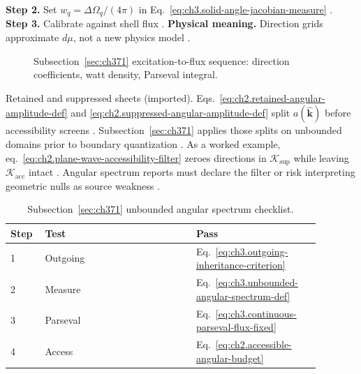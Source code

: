 \textbf{Step 2.} Set \(w_{q}=\Delta\Omega_{q}/(4\pi)\) in Eq.~\eqref{eq:ch3.solid-angle-jacobian-measure} \cite{hansen1988}.
\textbf{Step 3.} Calibrate against shell flux \cite{poynting1884}.
\textbf{Physical meaning.} Direction grids approximate \(d\mu\), not a new physics model \cite{harrington2001}.
\begin{figure}[t]
\centering
{}
\caption{Subsection~\ref{sec:ch371} excitation-to-flux sequence: direction coefficients, watt density, Parseval integral.}
\label{fig:ch3.371-operator-chain}
\end{figure}
Retained and suppressed sheets (imported). Eqs.~\eqref{eq:ch2.retained-angular-amplitude-def} and \eqref{eq:ch2.suppressed-angular-amplitude-def} split \(a(\widehat{\mathbf{k}})\)
before accessibility screens \cite{stratton1941}. Subsection~\ref{sec:ch371} applies those splits on unbounded
domains prior to boundary quantization \cite{hansen1988}.
As a worked example, eq.~\eqref{eq:ch2.plane-wave-accessibility-filter} zeroes directions in \(\mathcal{K}_{\mathrm{sup}}\) while leaving
\(\mathcal{K}_{\mathrm{acc}}\) intact \cite{harrington2001}. Angular spectrum reports must declare the filter
or risk interpreting geometric nulls as source weakness \cite{hansen1988}.
\begin{table}[t]
\centering
\caption{Subsection~\ref{sec:ch371} unbounded angular spectrum checklist.}
\label{tab:ch3.371-checklist}
\small
\begin{tabular}{@{}p{0.08\linewidth}p{0.44\linewidth}p{0.36\linewidth}@{}}
\toprule
Step & Test & Pass \\
\midrule
1 & Outgoing & Eq.~\eqref{eq:ch3.outgoing-inheritance-criterion} \\
2 & Measure & Eq.~\eqref{eq:ch3.unbounded-angular-spectrum-def} \\
3 & Parseval & Eq.~\eqref{eq:ch3.continuous-parseval-flux-fixed} \\
4 & Access & Eq.~\eqref{eq:ch2.accessible-angular-budget} \\
\bottomrule
\end{tabular}
\end{table}
